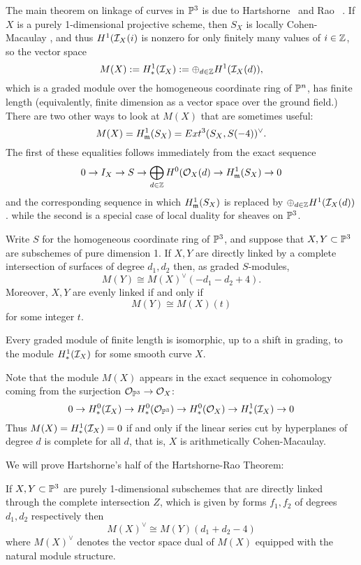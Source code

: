The main theorem on linkage of curves in $\PP^3$ is due to Hartshorne~\cite{} and Rao ~\cite{}. If $X$ is a purely 1-dimensional projective scheme, then $S_X$ is locally Cohen-Macaulay , and thus $H^1(\sI_X(i)$ is nonzero for only finitely many values of $i\in \ZZ$, so
the vector space
$$
M(X) := H^1_*(\sI_X) := \oplus_{d\in \ZZ}H^1(\sI_X(d)),
$$
which is a graded module over the homogeneous coordinate ring of $\PP^n$, has finite length (equivalently, finite dimension as a 
vector space over the ground field.) 
There are two other ways to look at $M(X)$ that are sometimes useful:
$$
M(X) = H^1_\gm(S_X) = Ext^3(S_X,S(-4))^\vee.
$$
The first of these equalities follows immediately from the exact sequence
$$
0\to I_X\to S \to \bigoplus_{d\in \ZZ} H^0(\sO_X(d) \to H^1_\gm(S_X) \to 0
$$
and the corresponding sequence in which $H^1_\gm(S_X)$ is replaced by $\oplus_{d\in \ZZ}H^1(\sI_X(d))$.
while the second is a special case of local duality for sheaves on $\PP^3$.

\begin{theorem}\label{Hartshorne-Rao}
Write $S$ for the homogeneous coordinate ring
of $\PP^3$, and suppose that $X,Y\subset \PP^3$ are subschemes of pure dimension 1. If $X,Y$ are directly linked by a complete
intersection of surfaces of degree $d_1,d_2$ then, as graded $S$-modules,
$$
M(Y)\cong M(X)^\vee(-d_1-d_2+4).
$$
Moreover, $X,Y$ are evenly linked if and only if 
$$
M(Y) \cong M(X)(t)
$$
 for some integer $t$. 
 
 Every graded module of finite length is isomorphic, up to a shift in grading,
to the module $H^1_*(\sI_X)$ for some smooth curve $X$.
\end{theorem}
Note that the module $M(X)$ appears in the exact sequence in cohomology coming from the surjection $\sO_{\PP^3} \to \sO_X$:
$$
0\to H^0_*(\sI_X) \to H^0_*(\sO_{\PP^3}) \to H^0_*(\sO_X) \to H^1_*(\sI_X) \to 0
$$
Thus $M(X) = H^1_*(\sI_X) = 0$ if and only if the linear series cut by hyperplanes of degree $d$ is complete for all $d$, that is,
$X$ is arithmetically Cohen-Macaulay.

We will prove Hartshorne's half of the Hartshorne-Rao Theorem:

\begin{theorem} \label{Hartshorne}
If $X,Y\subset \PP^3$ are purely 1-dimensional subschemes that are directly linked 
through the complete intersection $Z$, which is given by forms $f_1, f_2$ of degrees $d_1,d_2$ respectively
then
$$
M(X)^\vee \cong M(Y)(d_1+d_2-4)
$$
where $M(X)^\vee$ denotes the vector space dual of $M(X)$ equipped with the natural module structure.
 \end{theorem}

